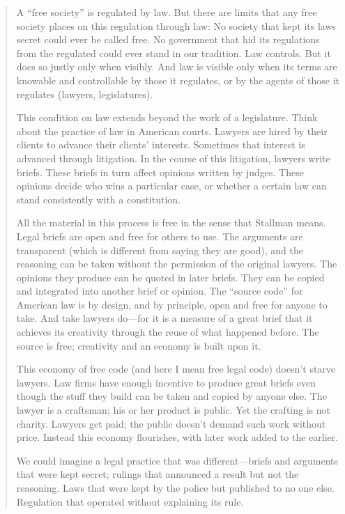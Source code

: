 \begin{quotation}

A ``free society'' is regulated by law. But there are limits that any free
society places on this regulation through law: No society that kept its
laws secret could ever be called free. No government that hid its
regulations from the regulated could ever stand in our tradition. Law
controls. But it does so justly only when visibly. And law is visible
only when its terms are knowable and controllable by those it regulates,
or by the agents of those it regulates (lawyers, legislatures).

This condition on law extends beyond the work of a legislature. Think
about the practice of law in American courts. Lawyers are hired by their
clients to advance their clients' interests. Sometimes that interest is
advanced through litigation. In the course of this litigation, lawyers
write briefs. These briefs in turn affect opinions written by judges.
These opinions decide who wins a particular case, or whether a certain law
can stand consistently with a constitution.

All the material in this process is free in the sense that Stallman means.
Legal briefs are open and free for others to use. The arguments are
transparent (which is different from saying they are good), and the
reasoning can be taken without the permission of the original lawyers.
The opinions they produce can be quoted in later briefs. They can be
copied and integrated into another brief or opinion. The ``source code''
for American law is by design, and by principle, open and free for anyone
to take. And take lawyers do---for it is a measure of a great brief that
it achieves its creativity through the reuse of what happened before. The
source is free; creativity and an economy is built upon it.

This economy of free code (and here I mean free legal code) doesn't starve
lawyers. Law firms have enough incentive to produce great briefs even
though the stuff they build can be taken and copied by anyone else. The
lawyer is a craftsman; his or her product is public. Yet the crafting is
not charity. Lawyers get paid; the public doesn't demand such work
without price. Instead this economy flourishes, with later work added to
the earlier.

We could imagine a legal practice that was different---briefs and
arguments that were kept secret; rulings that announced a result but not
the reasoning. Laws that were kept by the police but published to no one
else. Regulation that operated without explaining its rule.


\end{quotation}
